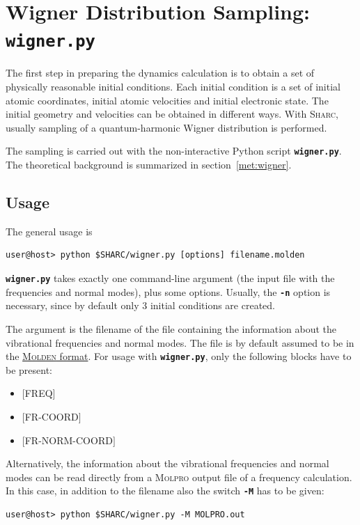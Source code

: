 \documentclass[a4paper,11pt,DIV=15,openany,twoside=false]{scrbook}
\newcommand{\sharc}{\textsc{Sharc}}
\newcommand{\ttt}[1]{\textbf{\texttt{#1}}}
\begin{document}
\section{Wigner Distribution Sampling: \ttt{wigner.py}}\label{sec:wigner.py}

The first step in preparing the dynamics calculation is to obtain a set of physically reasonable initial conditions. Each initial condition is a set of initial atomic coordinates, initial atomic velocities and initial electronic state. The initial geometry and velocities can be obtained in different ways. With \sharc, usually sampling of a quantum-harmonic Wigner distribution is performed. 

The sampling is carried out with the non-interactive Python script \ttt{wigner.py}. The theoretical background is summarized in section~\ref{met:wigner}.

\subsection{Usage}

The general usage is 
\begin{verbatim}
user@host> python $SHARC/wigner.py [options] filename.molden
\end{verbatim}
\ttt{wigner.py} takes exactly one command-line argument (the input file with the frequencies and normal modes), plus some options. Usually, the \ttt{-n} option is necessary, since by default only 3 initial conditions are created.

The argument is the filename of the file containing the information about the vibrational frequencies and normal modes. The file is by default assumed to be in the \href{http://www.cmbi.ru.nl/molden/molden_format.html}{\textsc{Molden} format}. For usage with \ttt{wigner.py}, only the following blocks have to be present:

\begin{minipage}{0.9\textwidth}
  \begin{itemize}
    \item $[$FREQ$]$
    \item $[$FR-COORD$]$
    \item $[$FR-NORM-COORD$]$
  \end{itemize}
\end{minipage}

Alternatively, the information about the vibrational frequencies and normal modes can be read directly from a \textsc{Molpro} output file of a frequency calculation. In this case, in addition to the filename also the switch \ttt{-M} has to be given:
\begin{verbatim}
user@host> python $SHARC/wigner.py -M MOLPRO.out
\end{verbatim}
\end{document}
